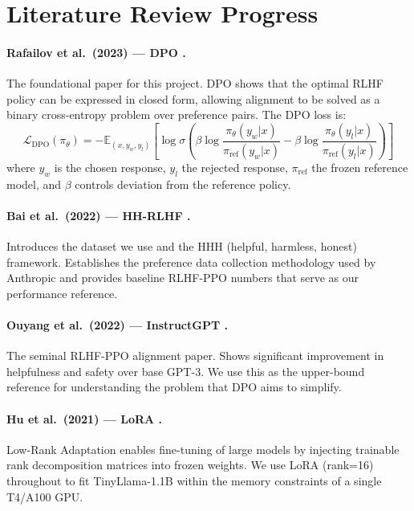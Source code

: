 \documentclass[12pt,a4paper]{article}
\begin{document}
\section{Literature Review Progress}

\paragraph{Rafailov et al.\ (2023) --- DPO \cite{rafailov2023}.}
The foundational paper for this project. DPO shows that the optimal RLHF policy can
be expressed in closed form, allowing alignment to be solved as a binary
cross-entropy problem over preference pairs. The DPO loss is:
\[
\mathcal{L}_\text{DPO}(\pi_\theta) = -\mathbb{E}_{(x,y_w,y_l)} \left[
    \log \sigma\!\left(
        \beta \log \frac{\pi_\theta(y_w|x)}{\pi_\text{ref}(y_w|x)}
        - \beta \log \frac{\pi_\theta(y_l|x)}{\pi_\text{ref}(y_l|x)}
    \right)
\right]
\]
where $y_w$ is the chosen response, $y_l$ the rejected response,
$\pi_\text{ref}$ the frozen reference model, and $\beta$ controls deviation
from the reference policy.

\paragraph{Bai et al.\ (2022) --- HH-RLHF \cite{bai2022}.}
Introduces the dataset we use and the HHH (helpful, harmless, honest) framework.
Establishes the preference data collection methodology used by Anthropic and
provides baseline RLHF-PPO numbers that serve as our performance reference.

\paragraph{Ouyang et al.\ (2022) --- InstructGPT \cite{ouyang2022}.}
The seminal RLHF-PPO alignment paper. Shows significant improvement in helpfulness
and safety over base GPT-3. We use this as the upper-bound reference for
understanding the problem that DPO aims to simplify.

\paragraph{Hu et al.\ (2021) --- LoRA \cite{hu2021}.}
Low-Rank Adaptation enables fine-tuning of large models by injecting trainable
rank decomposition matrices into frozen weights. We use LoRA (rank=16) throughout
to fit TinyLlama-1.1B within the memory constraints of a single T4/A100 GPU.
\end{document}
